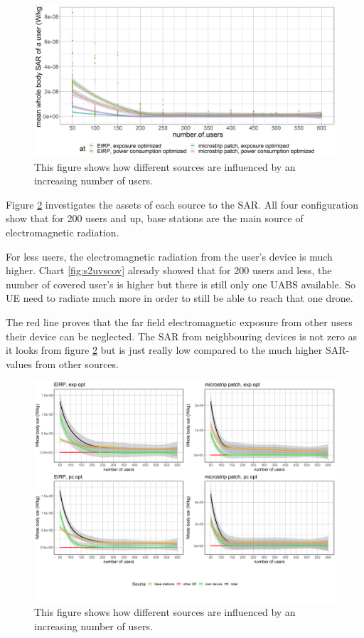 \begin{figure}[h!]
  \includegraphics[width=\textwidth]{../results/s2/uvssar.png}
  \caption{This figure shows how different sources are influenced by an increasing number of users. }
  \label{fig:s2uvssar}
\end{figure}

Figure \ref{fig:s2fourSourcesMatrix} investigates the assets of each source to the \gls{SAR}. All four 
configuration show that for 200 users and up, base stations are the main source of electromagnetic radiation.

For less users, the electromagnetic radiation from the user's device is much higher. Chart \ref{fig:s2uvscov} already 
showed that for 200 users and less, the number of covered user's is higher  but there is still only one \gls{UABS} available.
So \gls{UE}  need to radiate much more in order to still be able to reach that one drone.

The red line proves that the far field electromagnetic exposure from other users their device can be neglected. The \gls{SAR} from 
neighbouring devices is not zero as it looks from figure \ref{fig:s2fourSourcesMatrix} but is just really low compared to the much higher
\gls{SAR}-values from other sources.

\begin{figure}[h!]
  \includegraphics[width=\textwidth]{../results/s2/uFourSources.png}
  \caption{This figure shows how different sources are influenced by an increasing number of users. }
  \label{fig:s2fourSourcesMatrix}
\end{figure}

